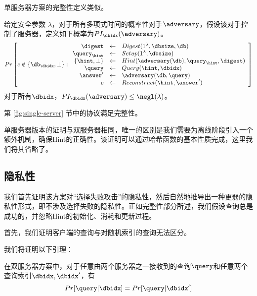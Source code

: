 单服务器方案的完整性定义类似。

\begin{definition}[单服务器方案的完整性]
    给定安全参数 $\lambda$，对于所有多项式时间的概率性对手$\adversary$，假设该对手控制了服务器，定义如下概率为$PI_\dbidx(\adversary)$。
$$ Pr\left[
            c \notin \{\db_\dbidx,\bot\}:
            \begin{array}{rcl}
                \digest        & \leftarrow & Digest(1^\lambda, \dbsize, \db)              \\
                \query_\hint   & \leftarrow & Setup(1^\lambda, \dbsize)                    \\
                \{\hint,\bot\} & \leftarrow & Hint(\adversary(\db), \query_\hint, \digest) \\
                \query         & \leftarrow & Query(\hint, \dbidx)                         \\
                \answer'       & \leftarrow & \adversary(\db, \query)                      \\
                c              & \leftarrow & Reconstruct(\hint, \answer')                 \\
            \end{array}
            \right]$$
对于所有$\dbidx$，$PI_\dbidx(\adversary) \leq \negl(\lambda)$。
\end{definition}

\begin{theorem}
第 \ref{fig:single-server} 节中的协议满足完整性。
\end{theorem}

单服务器版本的证明与双服务器相同，唯一的区别是我们需要为离线阶段引入一个额外机制，确保Hint的正确性。该证明可以通过哈希函数的基本性质完成，这里我们将其省略了。

\subsection{隐私性}

我们首先证明该方案对“选择失败攻击”的隐私性，然后自然地推导出一种更弱的隐私性形式，即不涉及选择失败的隐私性。正如完整性部分所述，我们假设查询总是成功的，并忽略Hint的初始化、消耗和更新过程。

首先，我们证明客户端的查询与对随机索引的查询无法区分。

我们将证明以下引理：

\begin{lemma}
\label{lemma:privacy}
    在双服务器方案中，对于任意由两个服务器之一接收到的查询$\query$和任意两个查询索引$\dbidx,\dbidx'$，有
    $$Pr[\query|\dbidx] = Pr[\query|\dbidx']$$
\end{lemma}

